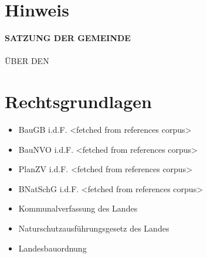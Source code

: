 \documentclass{bplan-festsetzungen}
\begin{document}
\bigskip

\section*{Hinweis}


\bigskip

\begin{center}
  \textbf{SATZUNG DER GEMEINDE}\\
  \Gemeinde\\
  ÜBER DEN\\
  \BPlanTyp
\end{center}

\bigskip

\section*{Rechtsgrundlagen}

\begin{itemize}
  \item BauGB i.d.F. <fetched from references corpus>
  \item BauNVO i.d.F. <fetched from references corpus>
  \item PlanZV i.d.F. <fetched from references corpus>
  \item BNatSchG i.d.F. <fetched from references corpus>
  \item Kommunalverfassung des Landes
  \item Naturschutzausführungsgesetz des Landes
  \item Landesbauordnung
\end{itemize}
\end{document}

